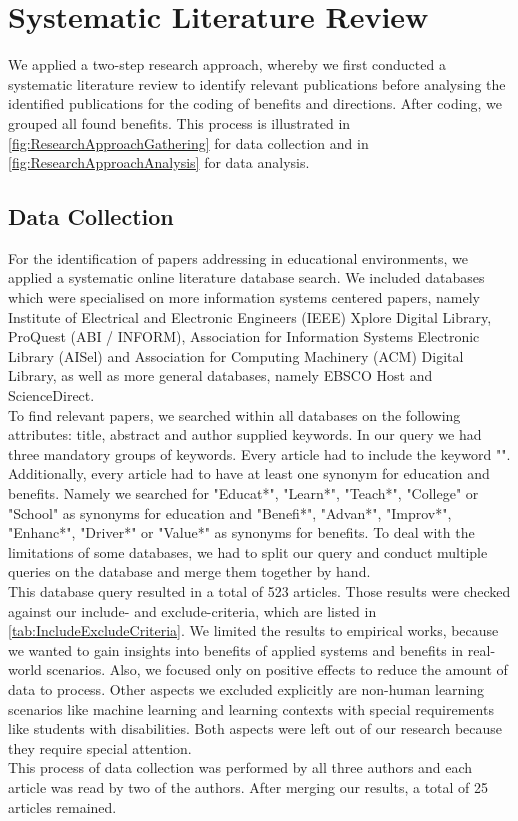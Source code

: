 \section{Systematic Literature Review}
We applied a two-step research approach, whereby we first conducted a systematic literature review to identify relevant publications before analysing the identified publications for the coding of benefits and directions. After coding, we grouped all found benefits. This process is illustrated in \ref{fig:ResearchApproachGathering} for data collection and in \ref{fig:ResearchApproachAnalysis} for data analysis.

\subsection{Data Collection}
For the identification of papers addressing \AR in educational environments, we applied a systematic online literature database search. We included databases which were specialised on more information systems centered papers, namely Institute of Electrical and Electronic Engineers (IEEE) Xplore Digital Library, ProQuest (ABI / INFORM), Association for Information Systems Electronic Library (AISel) and Association for Computing Machinery (ACM) Digital Library, as well as more general databases, namely EBSCO Host and ScienceDirect.\\
To find relevant papers, we searched within all databases on the following attributes: title, abstract and author supplied keywords. In our query we had three mandatory groups of keywords. Every article had to include the keyword "\AR". Additionally, every article had to have at least one synonym for education and benefits. Namely we searched for "Educat*", "Learn*", "Teach*", "College" or "School" as synonyms for education and "Benefi*", "Advan*", "Improv*", "Enhanc*", "Driver*" or "Value*" as synonyms for benefits. To deal with the limitations of some databases, we had to split our query and conduct multiple queries on the database and merge them together by hand.\\
This database query resulted in a total of 523 articles. Those results were checked against our include- and exclude-criteria, which are listed in \ref{tab:IncludeExcludeCriteria}. We limited the results to empirical works, because we wanted to gain insights into benefits of applied systems and benefits in real-world scenarios. Also, we focused only on positive effects to reduce the amount of data to process. Other aspects we excluded explicitly are non-human learning scenarios like machine learning and learning contexts with special requirements like students with disabilities. Both aspects were left out of our research because they require special attention. \\
This process of data collection was performed by all three authors and each article was read by two of the authors. After merging our results, a total of 25 articles remained.

